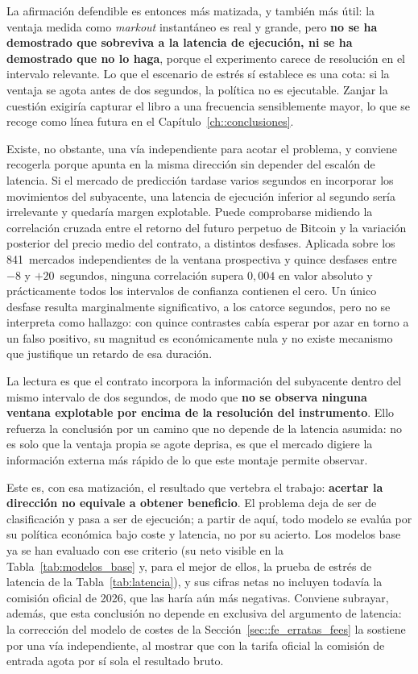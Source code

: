 La afirmación defendible es entonces más matizada, y también más útil: la ventaja medida
como \emph{markout} instantáneo es real y grande, pero \textbf{no se ha demostrado que
sobreviva a la latencia de ejecución, ni se ha demostrado que no lo haga}, porque el
experimento carece de resolución en el intervalo relevante. Lo que el escenario de estrés sí
establece es una cota: si la ventaja se agota antes de dos segundos, la política no es
ejecutable. Zanjar la cuestión exigiría capturar el libro a una frecuencia sensiblemente
mayor, lo que se recoge como línea futura en el Capítulo~\ref{ch::conclusiones}.

Existe, no obstante, una vía independiente para acotar el problema, y conviene recogerla
porque apunta en la misma dirección sin depender del escalón de latencia. Si el mercado de
predicción tardase varios segundos en incorporar los movimientos del subyacente, una
latencia de ejecución inferior al segundo sería irrelevante y quedaría margen explotable.
Puede comprobarse midiendo la correlación cruzada entre el retorno del futuro perpetuo de
Bitcoin y la variación posterior del precio medio del contrato, a distintos desfases.
Aplicada sobre los 841~mercados independientes de la ventana prospectiva y quince desfases
entre $-8$ y $+20$~segundos, ninguna correlación supera $0{,}004$ en valor absoluto y
prácticamente todos los intervalos de confianza contienen el cero. Un único desfase resulta
marginalmente significativo, a los catorce segundos, pero no se interpreta como hallazgo:
con quince contrastes cabía esperar por azar en torno a un falso positivo, su magnitud es
económicamente nula y no existe mecanismo que justifique un retardo de esa duración.

La lectura es que el contrato incorpora la información del subyacente dentro del mismo
intervalo de dos segundos, de modo que \textbf{no se observa ninguna ventana explotable por
encima de la resolución del instrumento}. Ello refuerza la conclusión por un camino que no
depende de la latencia asumida: no es solo que la ventaja propia se agote deprisa, es que el
mercado digiere la información externa más rápido de lo que este montaje permite observar.

Este es, con esa matización, el resultado que vertebra el trabajo: \textbf{acertar la
dirección no equivale a obtener beneficio}. El problema deja de ser de clasificación y pasa a
ser de ejecución; a partir de aquí, todo modelo se evalúa por su política económica bajo
coste y latencia, no por su acierto. Los modelos base ya se han evaluado con ese criterio
(su neto visible en la Tabla~\ref{tab:modelos_base} y, para el mejor de ellos, la prueba de
estrés de latencia de la Tabla~\ref{tab:latencia}), y sus cifras netas no incluyen todavía
la comisión oficial de 2026, que las haría aún más negativas. Conviene subrayar, además, que esta
conclusión no depende en exclusiva del argumento de latencia: la corrección del modelo de
costes de la Sección~\ref{sec::fe_erratas_fees} la sostiene por una vía independiente, al
mostrar que con la tarifa oficial la comisión de entrada agota por sí sola el resultado
bruto.


